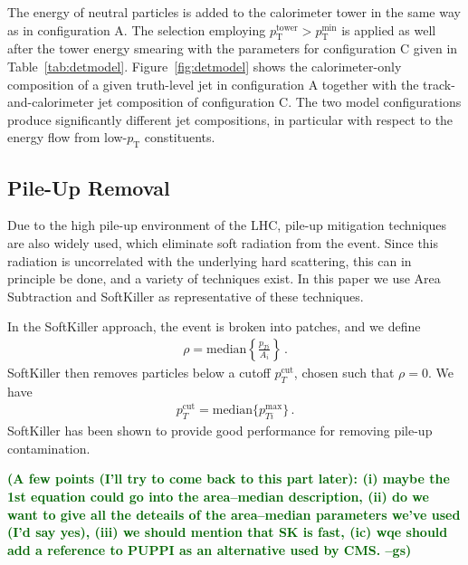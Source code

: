 \documentclass[11pt,letterpaper]{article}
\newcommand{\pt}{\ensuremath{p_{\text{T}}}}
\newcommand{\ptmin}{\ensuremath{p_{\text{T}}^{\text{min}}}}
\newcommand{\pttower}{\ensuremath{p_{\text{T}}^{\text{tower}}}}
\newcommand{\gs}[1]{\textbf{\textcolor{darkgreen}{(#1 --gs)}}}
\begin{document}
The energy of neutral particles is added to the calorimeter tower in the same way as in configuration A. 
The selection employing $\pttower > \ptmin$ is applied as well after the tower energy smearing with the parameters for configuration C given in Table~\ref{tab:detmodel}. 
Figure~\ref{fig:detmodel} shows the calorimeter-only composition of a given truth-level jet in configuration A together with the track-and-calorimeter jet composition of configuration C.
The two model configurations produce significantly different jet compositions, in particular with respect to the energy flow from low-\pt{} constituents.










\subsection{Pile-Up Removal}\label{sec:pu_tech}

Due to the high pile-up environment of the LHC, pile-up mitigation techniques \cite{Cacciari:2007fd,Alon:2011xb,Soyez:2012hv,Tseng:2013dva,Krohn:2013lba,Cacciari:2014gra,Bertolini:2014bba} are also widely used, which eliminate soft radiation from the event.
%
Since this radiation is uncorrelated with the underlying hard scattering, this can in principle be done, and a variety of techniques exist.
%
In this paper we use Area Subtraction \cite{Cacciari:2007fd,Cacciari:2008gn} and SoftKiller \cite{Cacciari:2014gra} as representative of these techniques.

In the SoftKiller approach, the event is broken into patches, and we define
\begin{align}
\rho= \text{median} \left \{ \frac{p_{Ti}}{A_i}   \right \}\,.
\end{align}
SoftKiller then removes particles below a cutoff $p_T^{\text{cut}}$, chosen such that $\rho=0$. We have
\begin{align}
p_T^{\text{cut}}=\text{median} \{ p_{Ti}^{\text{max}} \}\,.
\end{align}
SoftKiller has been shown to provide good performance for removing pile-up contamination.

\gs{A few points (I'll try to come back to
  this part later): (i) maybe the 1st equation could go into the
  area--median description, (ii) do we want to give all the deteails
  of the area--median parameters we've used (I'd say yes), (iii) we
  should mention that SK is fast, (ic) wqe should add a reference to
  PUPPI as an alternative used by CMS.}
\end{document}
